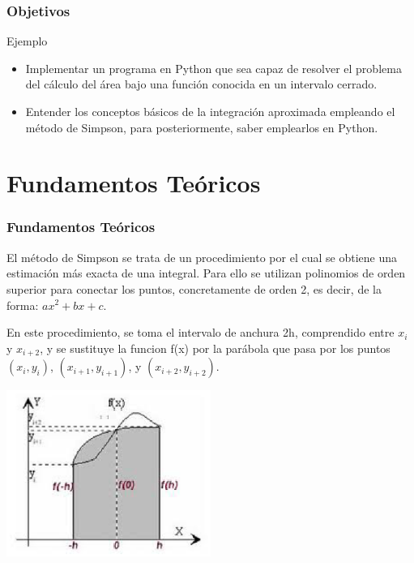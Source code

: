 \documentclass{beamer}
\begin{document}
\begin{frame}

\frametitle{Objetivos }

\begin{block}{Ejemplo}
  \begin{itemize}
  \item
   Implementar un programa en Python que sea capaz de resolver el problema del cálculo del área bajo una función conocida en un 
   intervalo cerrado.
  \pause
  \item
   Entender los conceptos básicos de la integración aproximada empleando el método de Simpson, para posteriormente, saber emplearlos
   en Python.

  \end{itemize}
\end{block}

\end{frame}

\section{Fundamentos Teóricos}

\begin{frame}
\frametitle{Fundamentos Teóricos}
	El método de Simpson se trata de un procedimiento por el cual se obtiene una estimación más exacta de una integral. Para ello se 
utilizan polinomios de orden superior para conectar los puntos, concretamente de orden 2, es decir, de la forma: $ ax^2 + bx + c $.

	En este procedimiento, se toma el intervalo de anchura 2h, comprendido entre $x_{i}$ y $ x_{i+2} $, y se sustituye la funcion f(x) por la parábola que pasa por los puntos $ (x_{i},y_{i}) $, $ (x_{i+1},y_{i+1}) $, y $ (x_{i+2},y_{i+2}) $.

\begin{center}
\includegraphics[width=0.5\textwidth]{slides/img/ima1}
\end{center}	
	

\end{frame}
\end{document}
